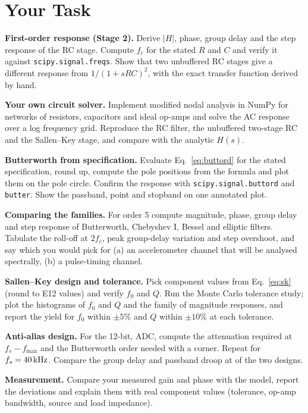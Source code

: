 \documentclass[11pt,a4paper]{article}
\begin{document}
\section*{Your Task}
\begin{tasks}
  \item \textbf{First-order response (Stage 2).} Derive $|H|$, phase, group delay and the step response of the RC stage. Compute $f_c$ for the stated $R$ and $C$ and verify it against \texttt{scipy.signal.freqs}. Show that two unbuffered RC stages give a different response from $1/(1+sRC)^2$, with the exact transfer function derived by hand.
  \item \textbf{Your own circuit solver.} Implement modified nodal analysis in NumPy for networks of resistors, capacitors and ideal op-amps and solve the AC response over a log frequency grid. Reproduce the RC filter, the unbuffered two-stage RC and the Sallen--Key stage, and compare with the analytic $H(s)$.
  \item \textbf{Butterworth from specification.} Evaluate Eq.~\eqref{eq:buttord} for the stated specification, round up, compute the pole positions from the formula and plot them on the pole circle. Confirm the response with \texttt{scipy.signal.buttord} and \texttt{butter}. Show the passband,  point and stopband on one annotated plot.
  \item \textbf{Comparing the families.} For order 5 compute magnitude, phase, group delay and step response of Butterworth, Chebyshev I, Bessel and elliptic filters. Tabulate the roll-off at $2f_c$, peak group-delay variation and step overshoot, and say which you would pick for (a) an accelerometer channel that will be analysed spectrally, (b) a pulse-timing channel.
  \item \textbf{Sallen--Key design and tolerance.} Pick component values from Eq.~\eqref{eq:sk} (round to E12 values) and verify $f_0$ and $Q$. Run the Monte Carlo tolerance study; plot the histograms of $f_0$ and $Q$ and the family of magnitude responses, and report the yield for $f_0$ within $\pm5\%$ and $Q$ within $\pm10\%$ at each tolerance.
  \item \textbf{Anti-alias design.} For the 12-bit,  ADC, compute the attenuation required at $f_s-f_{\max}$ and the Butterworth order needed with a  corner. Repeat for $f_s=\SI{40}{\kilo\hertz}$. Compare the group delay and passband droop at  of the two designs.
  \item \textbf{Measurement.} Compare your measured gain and phase with the model, report the deviations and explain them with real component values (tolerance, op-amp bandwidth, source and load impedance).
\end{tasks}
\end{document}
